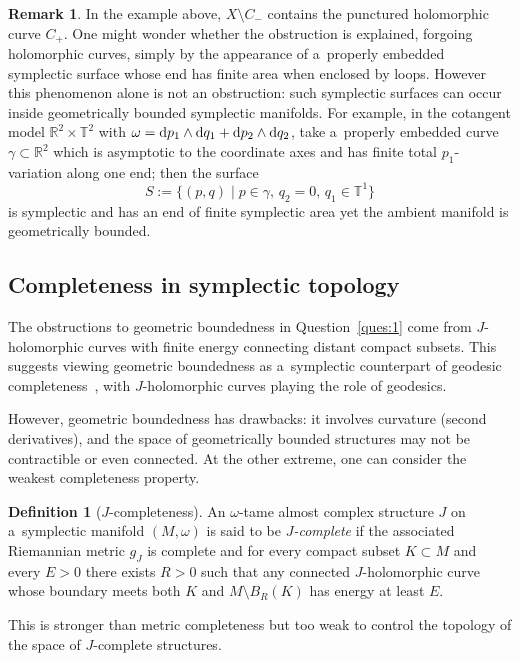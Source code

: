 \documentclass[pdftex]{sigma}
\numberwithin{equation}{section}
\newcommand{\bR}{{\mathbb R}}
\newcommand{\bT}{{\mathbb T}}
\theoremstyle{definition}
\newtheorem{df}[Theorem]{Definition}
\newtheorem{rem}[Theorem]{Remark}
\begin{document}
\begin{rem}
In the example above, $X\setminus C_-$ contains the punctured holomorphic curve $C_+$. One might wonder whether the obstruction is explained, forgoing holomorphic curves, simply by the appearance of a~properly embedded symplectic surface whose end has finite area when enclosed by loops.
However this phenomenon alone is not an obstruction: such symplectic surfaces can occur inside geometrically bounded symplectic manifolds.
For example, in the cotangent model $\bR^2\times \bT^2$ with $\omega={\rm d}p_1\wedge {\rm d}q_1+{\rm d}p_2\wedge {\rm d}q_2$, take a~properly embedded curve $\gamma\subset\bR^2$ which is asymptotic to the coordinate axes and has finite total $p_1$-variation along one end; then the surface
\[
S:=\big\{(p,q)\mid p\in\gamma,\, q_2=0,\, q_1\in\bT^1\big\}
\]
is symplectic and has an end of finite symplectic area yet the ambient manifold is geometrically bounded.
\end{rem}
\subsection{Completeness in symplectic topology}\label{subsec:IntroCompleteness}
The obstructions to geometric boundedness in Question~\ref{ques:1} come from $J$-holomorphic curves with finite energy connecting distant compact subsets. This suggests viewing geometric boundedness as a~symplectic counterpart of geodesic completeness~\cite{McDuffSymplecticStructures}, with $J$-holomorphic curves playing the role of geodesics.

However, geometric boundedness has drawbacks: it involves curvature (second derivatives), and the space of geometrically bounded structures may not be contractible or even connected. At the other extreme, one can consider the weakest completeness property.

\begin{df}[$J$-completeness]\label{df:Jcomplete}
An $\omega$-tame almost complex structure $J$ on a~symplectic manifold $(M,\omega)$ is said to be \emph{$J$-complete} if the associated Riemannian metric $g_J$ is complete and for every compact subset $K\subset M$ and every $E>0$ there exists $R>0$ such that any connected $J$-holomorphic curve whose boundary meets both $K$ and $M\setminus B_R(K)$ has energy at least $E$.
\end{df}
This is stronger than metric completeness but too weak to control the topology of the space of $J$-complete structures.
\end{document}
